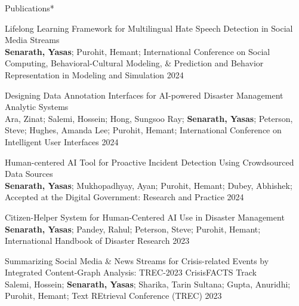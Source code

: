 \documentclass{resume} %
\begin{document}
\begin{rSection}{Publications*}

    \begin{rSubsection}{ Lifelong Learning Framework for Multilingual Hate Speech Detection in Social Media Streams }{\\ \textbf{Senarath, Yasas}; Purohit, Hemant; }{International Conference on Social Computing, Behavioral-Cultural Modeling, \& Prediction and  Behavior Representation in Modeling and Simulation}{ 2024 }
    \end{rSubsection}

    \vspace{-0.2in}

    \begin{rSubsection}{ Designing Data Annotation Interfaces for AI-powered Disaster Management Analytic Systems }{\\ Ara, Zinat; Salemi, Hossein; Hong, Sungsoo Ray; \textbf{Senarath, Yasas}; Peterson, Steve; Hughes, Amanda Lee; Purohit, Hemant; }{International Conference on Intelligent User Interfaces}{ 2024 }
    \end{rSubsection}

    \begin{rSubsection}{ Human-centered AI Tool for Proactive Incident Detection Using Crowdsourced Data Sources }{\\ \textbf{Senarath, Yasas}; Mukhopadhyay, Ayan; Purohit, Hemant; Dubey, Abhishek; }{Accepted at the Digital Government: Research and Practice}{ 2024 }
    \end{rSubsection}

    \begin{rSubsection}{ Citizen-Helper System for Human-Centered AI Use in Disaster Management }{\\ \textbf{Senarath, Yasas}; Pandey, Rahul; Peterson, Steve; Purohit, Hemant; }{International Handbook of Disaster Research}{ 2023 }
    \end{rSubsection}

    \begin{rSubsection}{ Summarizing Social Media \& News Streams for Crisis-related Events by Integrated Content-Graph Analysis: TREC-2023 CrisisFACTS Track }{\\ Salemi, Hossein; \textbf{Senarath, Yasas}; Sharika, Tarin Sultana; Gupta, Anuridhi; Purohit, Hemant; }{Text REtrieval Conference (TREC)}{ 2023 }
    \end{rSubsection}


\end{rSection}
\end{document}
